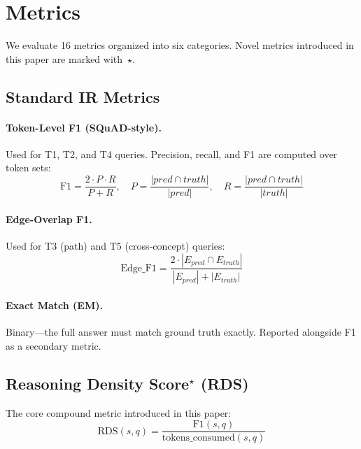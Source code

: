 \section{Metrics}\label{sec:metrics}

We evaluate 16 metrics organized into six categories. Novel metrics introduced
in this paper are marked with~$\star$.

\subsection{Standard IR Metrics}\label{sec:metrics-standard}

\paragraph{Token-Level F1 (SQuAD-style).}
Used for T1, T2, and T4 queries. Precision, recall, and F1 are computed over
token sets:
\begin{equation}
  \text{F1} = \frac{2 \cdot P \cdot R}{P + R}, \quad
  P = \frac{|pred \cap truth|}{|pred|}, \quad
  R = \frac{|pred \cap truth|}{|truth|}
\end{equation}

\paragraph{Edge-Overlap F1.}
Used for T3 (path) and T5 (cross-concept) queries:
\begin{equation}
  \text{Edge\_F1} = \frac{2 \cdot |E_{pred} \cap E_{truth}|}{|E_{pred}| + |E_{truth}|}
\end{equation}

\paragraph{Exact Match (EM).}
Binary---the full answer must match ground truth exactly. Reported alongside F1
as a secondary metric.

\subsection{Reasoning Density Score$^\star$ (RDS)}\label{sec:metrics-rds}

The core compound metric introduced in this paper:
\begin{equation}\label{eq:rds}
  \text{RDS}(s, q) = \frac{\text{F1}(s, q)}{\text{tokens\_consumed}(s, q)}
\end{equation}

